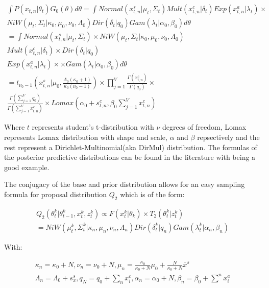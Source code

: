 \documentclass[twoside,hidelinks]{article}
\begin{document}
\begin{equation} \label{Q1}
	\begin{split}
		 	\int P(x_{t,n} | \theta_t )G_0(\theta) d\theta =
		 	\int Normal(x_{t,n}^s| \mu_t, \Sigma_t) Mult(x_{t,n}^c | \delta_t) Exp(x_{t,n}^a | \lambda_t) \times  \\ NiW( \mu_t, \Sigma_t | \kappa_0, \mu_0, \nu_0, \Lambda_0 ) Dir(\delta_t | q_0) Gam( \lambda_t | \alpha_0, \beta_0)  d\theta  \\
			= \int Normal(x_{t,n}^s| \mu_t, \Sigma_t) \times NiW( \mu_t, \Sigma_t | \kappa_0, \mu_0, \nu_0, \Lambda_0 )\\
			 Mult(x_{t,n}^c | \delta_t) \times Dir(\delta_t | q_0) \\
			 Exp(x_{t,n}^a | \lambda_t) \times  \times Gam( \lambda_t | \alpha_0, \beta_0)  d\theta  \\
		 	= t_{\nu_0-1}( x_{t,n}^s | \mu_0, \frac{\Lambda_0(\kappa_0+1)}{\kappa_0(\nu_0-1)}) \times \prod_{j=1}^V \frac{\Gamma(x_{t,n}^c)}{\Gamma(q_0)} \times \\ \frac{\Gamma(\sum_{j=1}^V q_0)}{\Gamma(\sum_{j=1}^V x_{t,n}^c)} \times Lomax(\alpha_0 + s_{t,n}^c, \beta_0 \sum_{j=1}^V x_{t,n}^c)
 	\end{split}
\end{equation}

Where $t$ represents student's t-distribution with $\nu$ degrees of freedom, Lomax represents Lomax distribution with shape and scale, $\alpha$ and $\beta$ repsectively and the rest represent a Dirichlet-Multinomial(aka DirMul) distribution. The formulas of the posterior predictive distributions can be found in the literature with \cite{compendium} being a good example. 

The conjugacy of the base and prior distribution allows for an easy sampling formula for proposal distribution $Q_2$ which is of the form: 


\begin{equation} \label{Q_2}
\begin{split}
Q_2(\theta_t^k | \theta_{t-1}^k , x_t^k, z_t^k) \propto F( x_t^k | \theta_k) \times T_2(\theta_t^k | z_t^k) \\
= NiW( \mu_t^k, \Sigma_t^k | \kappa_n, \mu_n, \nu_n, \Lambda_n ) Dir(\delta_t^k | q_n) Gam(\lambda_t^k | \alpha_n, \beta_n)
\end{split}
\end{equation}

With:

\begin{equation} \label{udpates}
\begin{split}
\kappa_n = \kappa_0 + N ,
\nu_n = \nu_0 + N ,
\mu_n = \frac{\kappa_0}{\kappa_0 + N} \mu_0 +  \frac{N}{\kappa_0 + N} \overline{x}^s\\
\Lambda_n = \Lambda_0 + s_{x}^s,
q_N = q_0 +  \sum_n x_i^c,
\alpha_n = \alpha_0 +  N,
\beta_n = \beta_0 +  \sum^n x_i^a
\end{split}
\end{equation}
\end{document}
